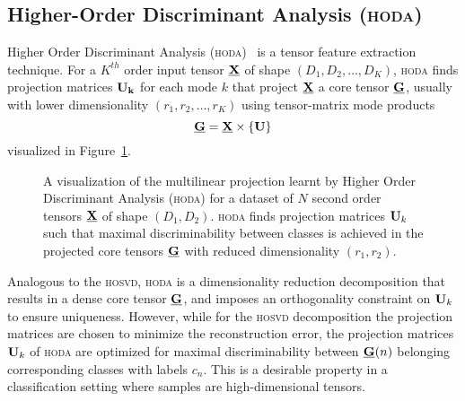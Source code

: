 \documentclass[twocolumn]{article}
\begin{document}
\subsection{Higher-Order Discriminant Analysis (\textsc{hoda})}
Higher Order Discriminant Analysis (\textsc{hoda})~\cite{Phan2010} is a tensor
feature extraction technique. For a $K^{th}$ order input tensor $\underline{\mathbf{X}}$ of
shape $(D_1,D_2,\ldots,D_K)$, \textsc{hoda} finds projection matrices $\mathbf{U_k}$ for each mode $k$
that project $\underline{\mathbf{X}}$ a core tensor $\underline{\mathbf{G}}$, usually with lower
dimensionality $(r_1,r_2,\ldots,r_K)$ using tensor-matrix mode products
\begin{equation}
	\underline{\mathbf{G}}  = \underline{\mathbf{X}}\times\left\{\mathbf{U}\right\}
	\label{eq:hoda-backward}
\end{equation}
visualized in Figure~\ref{fig:hoda-backward}.
\begin{figure}
	\centering
	
	\caption{A visualization of the multilinear projection learnt by Higher Order
		Discriminant Analysis (\textsc{hoda}) for a dataset of $N$ second order tensors
		$\underline{\mathbf{X}}$ of shape $(D_1,D_2)$.
		\textsc{hoda} finds projection matrices $\mathbf{U}_k$ such that maximal
		discriminability between classes is achieved in the projected core tensors
		$\underline{\mathbf{G}}$ with reduced dimensionality $(r_1,r_2)$.}
	\label{fig:hoda-backward}
\end{figure}
Analogous to the \textsc{hosvd}, \textsc{hoda} is a dimensionality
reduction decomposition that results in a dense core tensor $\underline{\mathbf{G}}$, and
imposes an orthogonality constraint on $\mathbf{U}_k$ to ensure uniqueness.
However, while for the \textsc{hosvd} decomposition the projection matrices
are chosen to minimize the reconstruction error, the projection matrices
$\mathbf{U}_k$ of \textsc{hoda} are optimized for maximal discriminability between
$\underline{\mathbf{G}}(n)$ belonging corresponding classes with labels $c_n$.
This is a desirable property in a classification setting where samples are
high-dimensional tensors.
\end{document}
